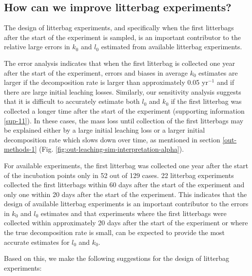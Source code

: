 \documentclass[
  12pt,
]{article}
\begin{document}
\hypertarget{out-discussion-5}{%
\subsection{How can we improve litterbag experiments?}\label{out-discussion-5}}

The design of litterbag experiments, and specifically when the first litterbags after the start of the experiment is sampled, is an important contributor to the relative large errors in \(k_0\) and \(l_0\) estimated from available litterbag experiments.

The error analysis indicates that when the first litterbag is collected one year after the start of the experiment, errors and biases in average \(k_0\) estimates are larger if the decomposition rate is larger than approximately 0.05 yr\(^{-1}\) and if there are large initial leaching losses. Similarly, our sensitivity analysis suggests that it is difficult to accurately estimate both \(l_0\) and \(k_0\) if the first litterbag was collected a longer time after the start of the experiment (supporting information \ref{sup-11}). In these cases, the mass loss until collection of the first litterbags may be explained either by a large initial leaching loss or a larger initial decomposition rate which slows down over time, as mentioned in section \ref{out-methods-1} (Fig. \ref{fig:out-leaching-sim-interpretation-alpha}).

For available experiments, the first litterbag was collected one year after the start of the incubation points only in 52 out of 129 cases. 22 litterbag experiments collected the first litterbags within 60 days after the start of the experiment and only one within 20 days after the start of the experiment. This indicates that the design of available litterbag experiments is an important contributor to the errors in \(k_0\) and \(l_0\) estimates and that experiments where the first litterbags were collected within approximately 20 days after the start of the experiment or where the true decomposition rate is small, can be expected to provide the most accurate estimates for \(l_0\) and \(k_0\).

Based on this, we make the following suggestions for the design of litterbag experiments:
\end{document}
